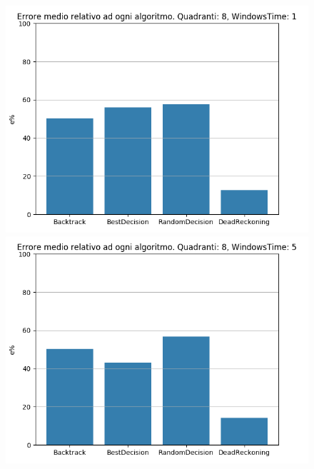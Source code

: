 \documentclass[12pt,a4paper,openright,twoside]{report}
\begin{document}
\begin{figure}[H]
\centering 
\includegraphics[scale=0.4]{secondChart8-1} 
\includegraphics[scale=0.4]{secondChart8-5} 
\end{figure}
\end{document}
